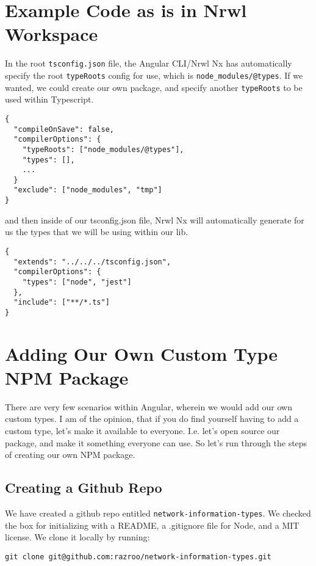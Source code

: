 \section{Example Code as is in Nrwl Workspace}
In the root \lstinline{tsconfig.json} file, the Angular CLI/Nrwl Nx has automatically
specify the root \lstinline{typeRoots} config for use, which is \lstinline{node_modules/@types}.
If we wanted, we could create our own package, and specify another 
\lstinline{typeRoots} to be used within Typescript. 
\begin{lstlisting}[caption=tsconfig.json]
{
  "compileOnSave": false,
  "compilerOptions": {
    "typeRoots": ["node_modules/@types"],
    "types": [],
    ...
  }
  "exclude": ["node_modules", "tmp"]
}
\end{lstlisting}

and then inside of our tsconfig.json file, Nrwl Nx will automatically generate
for us the types that we will be using within our lib. 
\begin{lstlisting}[caption=libs/common/services/tsconfig.json]
{
  "extends": "../../../tsconfig.json",
  "compilerOptions": {
    "types": ["node", "jest"]
  },
  "include": ["**/*.ts"]
} 
\end{lstlisting}

\section{Adding Our Own Custom Type NPM Package}
There are very few scenarios within Angular, wherein we would add our own 
custom types. I am of the opinion, that if you do find yourself having to 
add a custom type, let's make it available to everyone. I.e. let's open source 
our package, and make it something everyone can use. So let's run through the 
steps of creating our own NPM package. 

\subsection{Creating a Github Repo}
We have created a github repo entitled \lstinline{network-information-types}. 
We checked the box for initializing with a README, a .gitignore file for Node,
and a MIT license. We clone it locally by running: 
\begin{verbatim}
git clone git@github.com:razroo/network-information-types.git
\end{verbatim}

